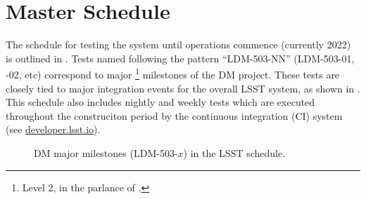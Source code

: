 \section{Master Schedule\label{sect:schedule}}

The schedule for testing the system until operations commence (currently 2022) is outlined in .
Tests named following the pattern ``LDM-503-NN'' (LDM-503-01, -02, etc) correspond to major \footnote{Level 2, in the parlance of .} milestones of the DM project.
These tests are closely tied to major integration events for the overall LSST system, as shown in .
This schedule also includes nightly and weekly tests which are executed throughout the construciton period by the continuous integration (CI) system (see \url{developer.lsst.io}).



\begin{figure}[htbp]

\begin{center}



\end{center}

\caption{DM major milestones (LDM-503-$x$) in the LSST schedule. \label{fig:schedule}}
\end{figure}
